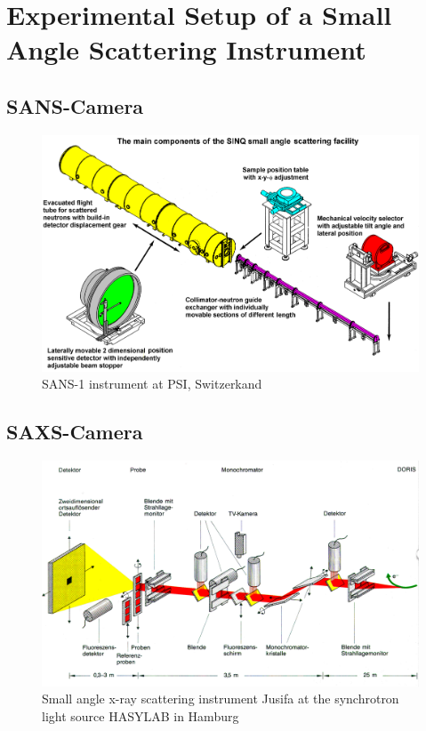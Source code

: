 \chapter{Experimental Setup of a Small Angle Scattering Instrument}
\section{SANS-Camera}
\begin{figure}[htb]
\begin{center}
\includegraphics[width=\textwidth]{SANSAN.png}
\caption{SANS-1 instrument at PSI, Switzerkand} \label{SANS1@PSI}
\end{center}
\end{figure}

\section{SAXS-Camera}

\begin{figure}[htb]
\begin{center}
\includegraphics[width=\textwidth]{CJUSIFA.png}
\caption{Small angle x-ray scattering instrument Jusifa at the
synchrotron light source HASYLAB in Hamburg} \label{Jusifa}
\end{center}
\end{figure}

